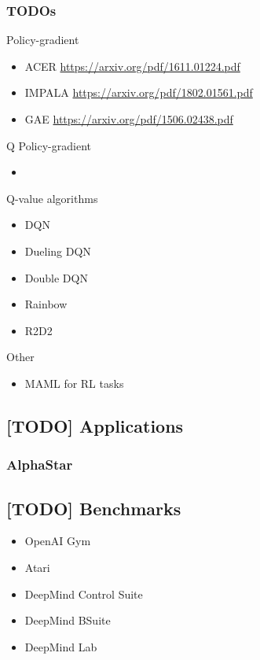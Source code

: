 \documentclass[12pt, english]{article}
\begin{document}
\subsubsection{TODOs}

Policy-gradient

\begin{itemize}
  \item ACER \url{https://arxiv.org/pdf/1611.01224.pdf}
  \item IMPALA \url{https://arxiv.org/pdf/1802.01561.pdf}
  \item GAE \url{https://arxiv.org/pdf/1506.02438.pdf}
\end{itemize}

Q Policy-gradient

\begin{itemize}
  \item
\end{itemize}

Q-value algorithms
\begin{itemize}
  \item DQN
  \item Dueling DQN
  \item Double DQN
  \item Rainbow
  \item R2D2
\end{itemize}

Other

\begin{itemize}
  \item MAML for RL tasks
\end{itemize}


\subsection{[TODO] Applications}

\subsubsection{AlphaStar}


\subsection{[TODO] Benchmarks}

\begin{itemize}
  \item OpenAI Gym
  \item Atari
  \item DeepMind Control Suite
  \item DeepMind BSuite
  \item DeepMind Lab
\end{itemize}
\end{document}

